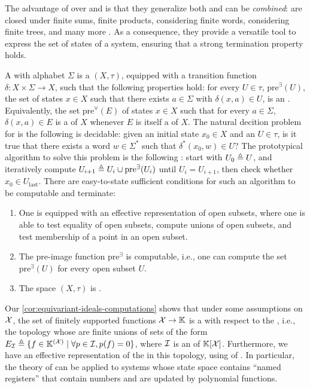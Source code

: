\AP The advantage of  over  and
 is that they generalize both and can be \emph{combined}:
 are closed under finite sums, finite products,
considering finite words, considering finite trees, and many more .
As a consequence, they provide a versatile tool to express the set of states of
a system, ensuring that a strong termination property holds.

\AP A  with alphabet
$\Sigma$ is a  $(X, \tau)$, equipped with a transition
function $\delta \colon X \times \Sigma \to X$, such that the following
properties hold: for every $U \in \tau$, $\mathrm{pre}^\exists(U)$, the set of
states $x \in X$ such that there exists $a \in \Sigma$ with $\delta(x, a) \in
U$, is an . Equivalently, the set $\mathrm{pre}^\forall(E)$ of
states $x \in X$ such that for every $a \in \Sigma$, $\delta(x, a) \in E$ is a
 of $X$ whenever $E$ is itself a  of $X$.
The natural decition problem for  is the following  is decidable: given
an initial state $x_0 \in X$ and an  $U \in \tau$, is it true that
there exists a word $w \in \Sigma^*$ such that $\delta^*(x_0, w) \in U$? The
prototypical algorithm to solve this problem is the following : start with $U_0 \triangleq U$, and iteratively compute $U_{i+1}
\triangleq U_i \cup \mathrm{pre}^\exists(U_i)$ until $U_i = U_{i+1}$, then check
whether $x_0 \in U_\text{last}$.
There are easy-to-state sufficient conditions  for such an algorithm to be computable and terminate:
\begin{enumerate}
  \item One is equipped with an effective representation of open subsets,
    where one is able to test equality of open subsets, compute unions of open subsets, and test 
    membership of a point in an open subset.
  \item The pre-image function $\mathrm{pre}^\exists$ is computable, i.e., one can
    compute the set $\mathrm{pre}^\exists(U)$ for every open subset $U$.
  \item The space $(X, \tau)$ is . 
\end{enumerate}

\AP Our \cref{cor:equivariant-ideals-computations} shows that
under some assumptions on $\mathcal{X}$, the set of finitely supported functions
$\mathcal{X} \to \mathbb{K}$ is a  with respect to the
, i.e., the topology whose 
are finite unions of sets of the form $E_{\idl} \defined \setof{f \in
\K^{(\Indets)}}{\forall p \in \idl, p(f) = 0}$, where $\idl$ is an
 of $\mathbb{K}[\mathcal{X}]$. Furthermore, we have an
effective representation of the  in this topology, using
 of . In particular, the
theory of  can be applied to
systems whose state space contains ``named registers'' that contain numbers and
are updated by polynomial functions.



